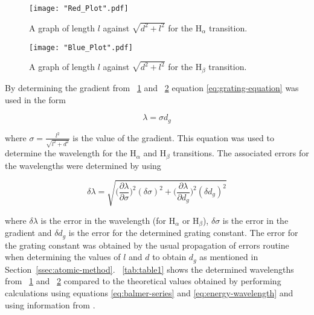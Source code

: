 \documentclass{article}
\newcommand{\figref}[2][\figurename~]{#1\ref{#2}}
\newcommand{\tabref}[2][\tablename~]{#1\ref{#2}}
\newcommand{\secref}[2][Section~]{#1\ref{#2}}
\begin{document}
\begin{figure}[h]
\centering
\texttt{[image: "Red\_Plot".pdf]}
\caption{A graph of length $l$ against $\sqrt{d^2+l^2}$ for the H$_\alpha$ transition.}
\label{fig:Red_Plot}
\end{figure}

\begin{figure}[h]
\centering
\texttt{[image: "Blue\_Plot".pdf]}
\caption{A graph of length $l$ against $\sqrt{d^2+l^2}$ for the H$_\beta$ transition.}
\label{fig:Blue_Plot}
\end{figure}

\vspace{2mm}
\noindent
By determining the gradient from \figref{fig:Red_Plot} and \figref{fig:Blue_Plot} equation \eqref{eq:grating-equation} was used in the form 

\begin{equation}
\label{eq:wavelength}
\lambda = \sigma d_g
\end{equation}

\vspace{2mm}
\noindent
where $\sigma = \frac{l^2}{\sqrt{l^2+d^2}}$ is the value of the gradient. This equation was used to determine the wavelength for the H$_\alpha$ and H$_\beta$ transitions. The associated errors for the wavelengths were determined by using

\begin{equation}
\label{eq:wavelength-error}
\delta\lambda = \sqrt{\bigg(\frac{\partial{\lambda}}{\partial{\sigma}}\bigg)^2(\delta\sigma)^2 + \bigg(\frac{\partial{\lambda}}{\partial{d_g}}\bigg)^2(\delta d_g)^2}
\end{equation}

\vspace{2mm}
\noindent
where $\delta\lambda$ is the error in the wavelength (for H$_\alpha$ or H$_\beta$), $\delta\sigma$ is the error in the gradient and $\delta d_g$ is the error for the determined grating constant. The error for the grating constant was obtained by the usual propagation of errors routine  when determining the values of $l$ and $d$ to obtain $d_g$ as mentioned in \secref{ssec:atomic-method}. \tabref{tab:table1} shows the determined wavelengths from \figref{fig:Red_Plot} and \figref{fig:Blue_Plot} compared to the theoretical values obtained by performing calculations using equations \eqref{eq:balmer-series} and \eqref{eq:energy-wavelength} and using information from \cite{Paper01}.
\end{document}
